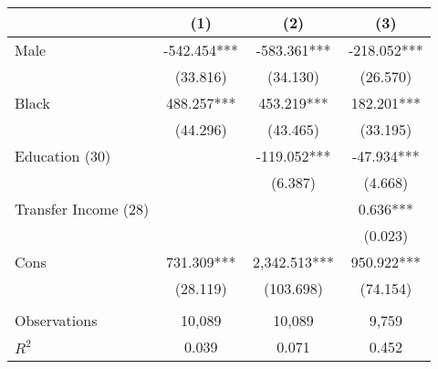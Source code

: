 \begin{tabular}{lccc} \toprule
 & (1) & (2) & (3) \\ \midrule 
Male & -542.454*** & -583.361*** & -218.052*** \\
 & (33.816) & (34.130) & (26.570) \\
Black & 488.257*** & 453.219*** & 182.201*** \\
 & (44.296) & (43.465) & (33.195) \\
Education (30)  &  & -119.052*** & -47.934*** \\
 &  & (6.387) & (4.668) \\
Transfer Income (28) &  &  & 0.636*** \\
 &  &  & (0.023) \\
Cons & 731.309*** & 2,342.513*** & 950.922*** \\
 & (28.119) & (103.698) & (74.154) \\ \\ \midrule
Observations & 10,089 & 10,089 & 9,759 \\
$R^2$ & 0.039 & 0.071 & 0.452 \\ \bottomrule
\end{tabular}
